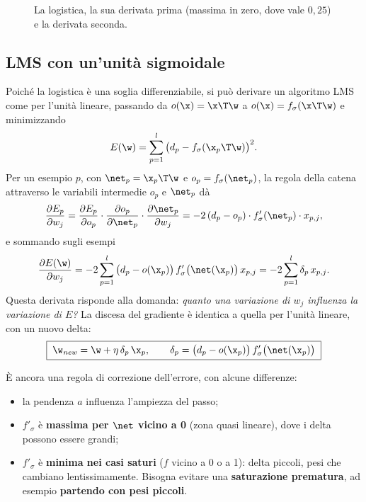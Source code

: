 \begin{figure}[ht]
\centering
{}
\caption{La logistica, la sua derivata prima (massima in zero, dove vale $0{,}25$) e la derivata seconda.}
\label{fig:derivate-sigmoide}
\end{figure}

\subsection{LMS con un'unità sigmoidale}
\label{sec:lms-sigmoide}

Poiché la logistica è una soglia differenziabile, si può derivare un algoritmo LMS come per l'unità lineare,
passando da $o(\x) = \x\T\w$ a $o(\x) = f_\sigma(\x\T\w)$ e minimizzando
\[
E(\w) = \sum_{p=1}^{l}\big(d_p - f_\sigma(\x_p\T\w)\big)^2 .
\]
Per un esempio $p$, con $\net_p = \x_p\T\w$ e $o_p = f_\sigma(\net_p)$, la regola della catena attraverso le
variabili intermedie $o_p$ e $\net_p$ dà
\[
\frac{\partial E_p}{\partial w_j} = \frac{\partial E_p}{\partial o_p}\cdot\frac{\partial o_p}{\partial\net_p}\cdot\frac{\partial\net_p}{\partial w_j}
= -2\,(d_p-o_p)\cdot f'_\sigma(\net_p)\cdot x_{p,j},
\]
e sommando sugli esempi
\[
\frac{\partial E(\w)}{\partial w_j} = -2\sum_{p=1}^{l}\big(d_p-o(\x_p)\big)\,f'_\sigma\big(\net(\x_p)\big)\,x_{p,j} = -2\sum_{p=1}^{l}\delta_p\,x_{p,j}.
\]
Questa derivata risponde alla domanda: \emph{quanto una variazione di $w_j$ influenza la variazione di $E$?} La
discesa del gradiente è identica a quella per l'unità lineare, con un nuovo delta:
\begin{equation}\label{eq:delta-sigmoide}
\boxed{\;\w_{\mathit{new}} = \w + \eta\,\delta_p\,\x_p,\qquad \delta_p = \big(d_p-o(\x_p)\big)\,f'_\sigma\big(\net(\x_p)\big)\;}
\end{equation}

È ancora una regola di correzione dell'errore, con alcune differenze:
\begin{itemize}
  \item la pendenza $a$ influenza l'ampiezza del passo;
  \item $f'_\sigma$ è \textbf{massima per $\net$ vicino a 0} (zona quasi lineare), dove i delta possono essere
        grandi;
  \item $f'_\sigma$ è \textbf{minima nei casi saturi} ($f$ vicino a 0 o a 1): delta piccoli, pesi che cambiano
        lentissimamente. Bisogna evitare una \textbf{saturazione prematura}, ad esempio \textbf{partendo con pesi
        piccoli}.
\end{itemize}

